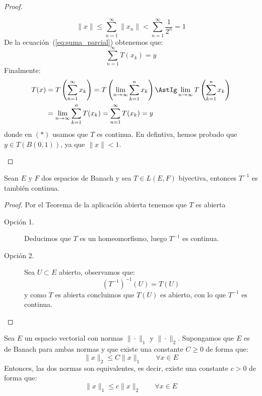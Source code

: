 \begin{teo}
\begin{proof}
\begin{description}
                \begin{equation*}
                    \|x\| \leq \sum_{n=1}^{\infty}\|x_n\| < \sum_{n=1}^{\infty}\frac{1}{2^n} =1
                \end{equation*}
                De la ecuación~(\ref{eq:suma_parcial}) obtenemos que:
                \begin{equation*}
                    \sum_{n=1}^{\infty}T(x_k) = y
                \end{equation*}
                Finalmente:
                \begin{align*}
                    T(x) &= T\left(\sum_{n=1}^{\infty}x_k\right) = T\left(\lim_{n\to\infty}\sum_{k=1}^{n}x_k\right) \AstIg \lim_{n\to\infty}T\left(\sum_{k=1}^{n}x_k\right) \\ &= \lim_{n\to\infty}\sum_{k=1}^{n}T(x_k) = \sum_{n=1}^{\infty}T(x_k)  = y
                \end{align*}
                donde en $(\ast)$ usamos que $T$ es continua. En defintiva, hemos probado que $y\in T(B(0,1))$, ya que $\|x\| < 1$.
        \end{description}
    \end{proof}
\end{teo}


\begin{coro}
    Sean $E$ y $F$ dos espacios de Banach y sea $T\in L(E,F)$ biyectiva, entonces $T^{-1}$ es también continua.
    \begin{proof}
        Por el Teorema de la aplicación abierta tenemos que $T$ es abierta
        \begin{description}
            \item [Opción 1.] Deducimos que $T$ es un homeomorfismo, luego $T^{-1}$ es continua.
            \item [Opción 2.] Sea $U\subset E$ abierto, observamos que:
                \begin{equation*}
                    {(T^{-1})}^{-1}(U) = T(U)
                \end{equation*}
                y como $T$ es abierta concluimos que $T(U)$ es abierto, con lo que $T^{-1}$ es continua.
        \end{description}
    \end{proof}
\end{coro}

\begin{coro}
    Sea $E$ un espacio vectorial con normas $\|\cdot \|_1$ y $\|\cdot \|_2$. Supongamos que $E$ es de Banach para ambas normas y que existe una constante $C\geq 0$ de forma que:
    \begin{equation*}
        \|x\|_2 \leq C\|x\|_1 \qquad \forall x\in E
    \end{equation*}
    Entonces, las dos normas son equivalentes, es decir, existe una constante $c>0$ de forma que:
    \begin{equation*}
        \|x\|_1 \leq c\|x\|_2 \qquad \forall x\in E
    \end{equation*}
\end{coro}
